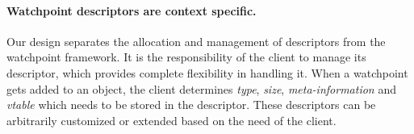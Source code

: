 \documentclass[letterpaper,twocolumn,10pt]{article}
\begin{document}


\paragraph{Watchpoint descriptors are context specific.} Our design separates the allocation and management of descriptors from the watchpoint framework. It is the responsibility of the client to manage its descriptor, which %
provides complete flexibility in handling it. When a watchpoint gets added to an object, the client determines \emph{type}, \emph{size}, \emph{meta-information} and \emph{vtable} which needs to be stored in the descriptor. These descriptors can be arbitrarily customized or extended based on the need of the client. %




\end{document}
